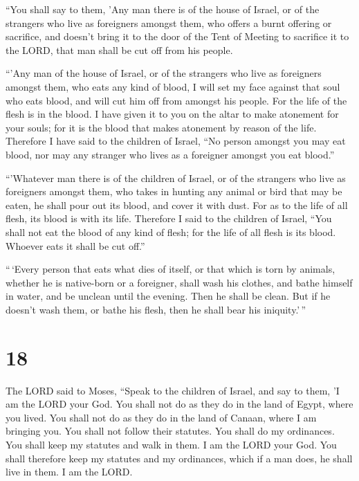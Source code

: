  ``You shall say to them, 'Any man there is of the house of
Israel, or of the strangers who live as foreigners amongst them, who
offers a burnt offering or sacrifice,  and doesn't bring it
to the door of the Tent of Meeting to sacrifice it to the LORD, that man
shall be cut off from his people.

 ``'Any man of the house of Israel, or of the strangers who
live as foreigners amongst them, who eats any kind of blood, I will set
my face against that soul who eats blood, and will cut him off from
amongst his people.  For the life of the flesh is in the
blood. I have given it to you on the altar to make atonement for your
souls; for it is the blood that makes atonement by reason of the life.
 Therefore I have said to the children of Israel, ``No
person amongst you may eat blood, nor may any stranger who lives as a
foreigner amongst you eat blood.''

 ``'Whatever man there is of the children of Israel, or of
the strangers who live as foreigners amongst them, who takes in hunting
any animal or bird that may be eaten, he shall pour out its blood, and
cover it with dust.  For as to the life of all flesh, its
blood is with its life. Therefore I said to the children of Israel,
``You shall not eat the blood of any kind of flesh; for the life of all
flesh is its blood. Whoever eats it shall be cut off.''

 ``\,`Every person that eats what dies of itself, or that
which is torn by animals, whether he is native-born or a foreigner,
shall wash his clothes, and bathe himself in water, and be unclean until
the evening. Then he shall be clean.  But if he doesn't
wash them, or bathe his flesh, then he shall bear his iniquity.'\,''

\hypertarget{section-17}{%
\section{18}\label{section-17}}

 The LORD said to Moses,  ``Speak to the
children of Israel, and say to them, 'I am the LORD your God.
 You shall not do as they do in the land of Egypt, where you
lived. You shall not do as they do in the land of Canaan, where I am
bringing you. You shall not follow their statutes.  You
shall do my ordinances. You shall keep my statutes and walk in them. I
am the LORD your God.  You shall therefore keep my statutes
and my ordinances, which if a man does, he shall live in them. I am the
LORD.

